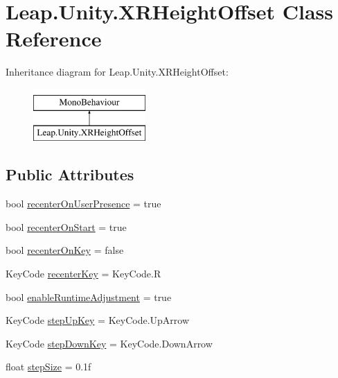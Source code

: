 \hypertarget{class_leap_1_1_unity_1_1_x_r_height_offset}{}\section{Leap.\+Unity.\+X\+R\+Height\+Offset Class Reference}
\label{class_leap_1_1_unity_1_1_x_r_height_offset}
Inheritance diagram for Leap.\+Unity.\+X\+R\+Height\+Offset\+:\begin{figure}[H]
\begin{center}
\leavevmode
\includegraphics[height=2.000000cm]{class_leap_1_1_unity_1_1_x_r_height_offset}
\end{center}
\end{figure}
\subsection*{Public Attributes}
\begin{DoxyCompactItemize}
\item 
bool \mbox{\hyperlink{class_leap_1_1_unity_1_1_x_r_height_offset_a1e55bc85120cf7fd3590730e2d0bbf90}{recenter\+On\+User\+Presence}} = true
\item 
bool \mbox{\hyperlink{class_leap_1_1_unity_1_1_x_r_height_offset_aa89278a651e5f9ae1a15b7bdfa210444}{recenter\+On\+Start}} = true
\item 
bool \mbox{\hyperlink{class_leap_1_1_unity_1_1_x_r_height_offset_aa609a6e1bab2d7393766fabf41ca4eea}{recenter\+On\+Key}} = false
\item 
Key\+Code \mbox{\hyperlink{class_leap_1_1_unity_1_1_x_r_height_offset_ab8fb43ee2bb8f789f5868ed4d64f1a1e}{recenter\+Key}} = Key\+Code.\+R
\item 
bool \mbox{\hyperlink{class_leap_1_1_unity_1_1_x_r_height_offset_a160ba995082678c7cd11b8bd6ba6bdf6}{enable\+Runtime\+Adjustment}} = true
\item 
Key\+Code \mbox{\hyperlink{class_leap_1_1_unity_1_1_x_r_height_offset_a4e0c22e1e51d4854433ac0cc8a444b81}{step\+Up\+Key}} = Key\+Code.\+Up\+Arrow
\item 
Key\+Code \mbox{\hyperlink{class_leap_1_1_unity_1_1_x_r_height_offset_a90410015bda7681115417d82d3a13da3}{step\+Down\+Key}} = Key\+Code.\+Down\+Arrow
\item 
float \mbox{\hyperlink{class_leap_1_1_unity_1_1_x_r_height_offset_abd0d557a4556194d4185277392523ac7}{step\+Size}} = 0.\+1f
\end{DoxyCompactItemize}
